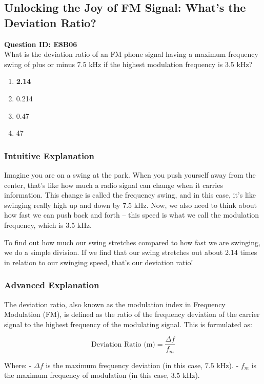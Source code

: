 \subsection{Unlocking the Joy of FM Signal: What's the Deviation Ratio?}

\begin{tcolorbox}
\textbf{Question ID: E8B06} \\
What is the deviation ratio of an FM phone signal having a maximum frequency swing of plus or minus 7.5 kHz if the highest modulation frequency is 3.5 kHz? 
\begin{enumerate}[label=\Alph*.]
    \item \textbf{2.14}
    \item 0.214
    \item 0.47
    \item 47
\end{enumerate}
\end{tcolorbox}

\subsubsection{Intuitive Explanation}
Imagine you are on a swing at the park. When you push yourself away from the center, that's like how much a radio signal can change when it carries information. This change is called the frequency swing, and in this case, it's like swinging really high up and down by 7.5 kHz. Now, we also need to think about how fast we can push back and forth – this speed is what we call the modulation frequency, which is 3.5 kHz. 

To find out how much our swing stretches compared to how fast we are swinging, we do a simple division. If we find that our swing stretches out about 2.14 times in relation to our swinging speed, that's our deviation ratio!

\subsubsection{Advanced Explanation}
The deviation ratio, also known as the modulation index in Frequency Modulation (FM), is defined as the ratio of the frequency deviation of the carrier signal to the highest frequency of the modulating signal. This is formulated as:

\[
\text{Deviation Ratio (m)} = \frac{\Delta f}{f_m}
\]

Where:
- \(\Delta f\) is the maximum frequency deviation (in this case, \(7.5 \text{ kHz}\)).
- \(f_m\) is the maximum frequency of modulation (in this case, \(3.5 \text{ kHz}\)).

